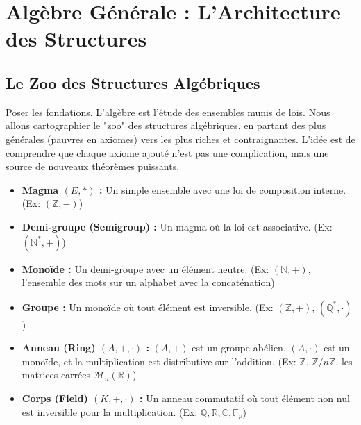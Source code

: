 \chapter{Algèbre Générale : L'Architecture des Structures}

\section{Le Zoo des Structures Algébriques}

\begin{objectif}
    Poser les fondations. L'algèbre est l'étude des ensembles munis de lois. Nous allons cartographier le "zoo" des structures algébriques, en partant des plus générales (pauvres en axiomes) vers les plus riches et contraignantes. L'idée est de comprendre que chaque axiome ajouté n'est pas une complication, mais une source de nouveaux théorèmes puissants.
\end{objectif}

\begin{definition}
    \begin{itemize}
        \item \textbf{Magma $(E, *)$ :} Un simple ensemble avec une loi de composition interne. (Ex: $(\mathbb{Z}, -)$)
        \item \textbf{Demi-groupe (Semigroup) :} Un magma où la loi est associative. (Ex: $(\mathbb{N}^*, +)$)
        \item \textbf{Monoïde :} Un demi-groupe avec un élément neutre. (Ex: $(\mathbb{N}, +)$, l'ensemble des mots sur un alphabet avec la concaténation)
        \item \textbf{Groupe :} Un monoïde où tout élément est inversible. (Ex: $(\mathbb{Z}, +)$, $(\mathbb{Q}^*,\cdot)$)
    \end{itemize}
\end{definition}

\begin{definition}
    \begin{itemize}
        \item \textbf{Anneau (Ring) $(A, +, \cdot)$ :} $(A,+)$ est un groupe abélien, $(A,\cdot)$ est un monoïde, et la multiplication est distributive sur l'addition. (Ex: $\mathbb{Z}$, $\mathbb{Z}/n\mathbb{Z}$, les matrices carrées $\mathcal{M}_n(\mathbb{R})$)
        \item \textbf{Corps (Field) $(K, +, \cdot)$ :} Un anneau commutatif où tout élément non nul est inversible pour la multiplication. (Ex: $\mathbb{Q}, \mathbb{R}, \mathbb{C}, \mathbb{F}_p$)
    \end{itemize}
\end{definition}

